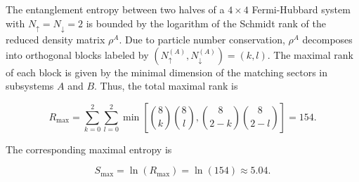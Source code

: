 


The entanglement entropy between two halves of a $4 \times 4$ Fermi-Hubbard system with $N_\uparrow = N_\downarrow = 2$ is bounded by the logarithm of the Schmidt rank of the reduced density matrix $\rho^A$. Due to particle number conservation, $\rho^A$ decomposes into orthogonal blocks labeled by $(N_\uparrow^{(A)}, N_\downarrow^{(A)}) = (k, l)$. The maximal rank of each block is given by the minimal dimension of the matching sectors in subsystems $A$ and $B$. Thus, the total maximal rank is

\begin{equation*}
R_{\max} = \sum_{k=0}^2 \sum_{l=0}^2 \min\left[ \binom{8}{k} \binom{8}{l}, \binom{8}{2-k} \binom{8}{2-l} \right] = 154.
\end{equation*}

The corresponding maximal entropy is

\begin{equation*}
S_{\max} = \ln(R_{\max}) = \ln(154) \approx 5.04.
\end{equation*}
